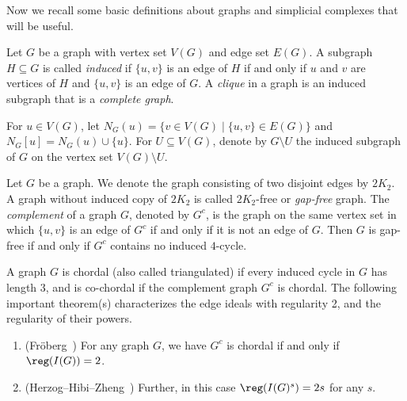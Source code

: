 Now we recall some basic definitions about graphs and simplicial complexes that will be useful.

Let $G$ be a graph with vertex set $V(G)$
and edge set $E(G)$.  
A subgraph $H \subseteq G$  is called \textit{induced} if $\{u,v\}$ is an edge of $H$ if and only if $u$ and $v$ are vertices of $H$ and $\{u,v\}$ is an edge of $G$. 
A \textit{clique} in a graph is an induced subgraph that is a  \emph{complete graph}.

For $u\in V(G)$, let $N_G(u) = \{v \in V (G)\mid \{u, v\} \in E(G)\}$ and $N_G[u]=N_G(u)\cup \{u\}$.
For $U \subseteq V(G)$, denote by $G \setminus U$
the induced subgraph of $G$ on the vertex set $V(G) \setminus U$.

Let $G$ be a graph. We denote the graph consisting of two disjoint edges
 by $2K_2$.
A graph without induced copy of $2K_2$ is called $2K_2$-free or \textit{gap-free} graph. The \textit{complement} of a graph $G$, denoted by $G^c$, is the graph on the same
vertex set in which $\{u,v\}$ is an edge of $G^c$ if and only if it is not an edge of $G$.
Then  $G$ is gap-free if and only if $G^c$ contains no induced $4$-cycle.

A graph $G$ is chordal (also called triangulated) if every induced
cycle in $G$ has length $3$, and is co-chordal if the complement graph $G^c$ is chordal.
 The following important theorem(s) characterizes the edge ideals with regularity 2, and the regularity of their powers.

 

\begin{theorem}
\begin{enumerate}
\item \textup{(}Fr\"oberg~\cite[Thm.1]{froberg}\textup{)} For any graph $G$, we have $G^c$ is chordal if and only if $\reg(I(G))=2$. 

\item \textup{(}Herzog--Hibi--Zheng~\cite[Thm.1.2]{HHZ}\textup{)} Further, in this case $\reg(I(G)^s)=2s$ for any $s$.
\end{enumerate}
\label{thm:chordal}
\end{theorem}

